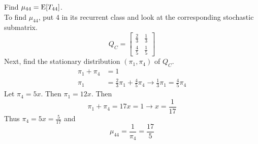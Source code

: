 \documentclass[12pt]{article}
\begin{document}
Find $\mu_{44} = \mathrm{E}[ T_{44} ]$. \\
To find $\mu_{44}$, put $4$ in its recurrent class and look at the corresponding stochastic submatrix. $$ Q_C = \begin{bmatrix} \frac{2}{3} & \frac{1}{3} \\ \frac{4}{5} & \frac{1}{5} \end{bmatrix} $$ Next, find the stationary distribution $(\pi_1, \pi_4)$ of $Q_C$. $$ \begin{aligned} \pi_1 + \pi_4 &= 1 \\ \pi_1 &= \frac{2}{3}\pi_1 + \frac{4}{5}\pi_4 \to \frac{1}{3} \pi_1 = \frac{4}{5}\pi_4 \end{aligned} $$ 
Let $\pi_4 = 5x$. Then $\pi_1 = 12x$. Then $$\pi_1 + \pi_4 = 17x = 1 \to x = \frac{1}{17} $$ 
Thus $\pi_4 = 5x = \frac{5}{17}$ and $$ \mu_{44} = \frac{1}{\pi_4} = \frac{17}{5} $$ 
\end{document}
